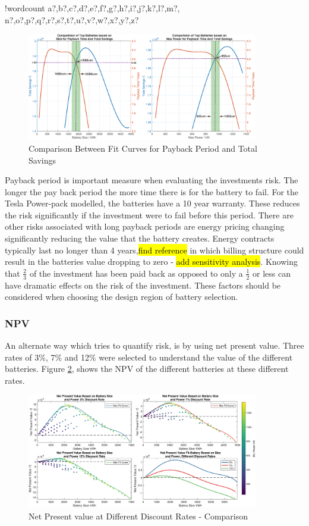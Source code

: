 \documentclass[fontsize=9.5pt]{extarticle}
\numberwithin{figure}{section} %
\newcounter{words}
\newenvironment{counted}{%
  \setcounter{words}{0}
  \SearchList!{wordcount}{\stepcounter{words}}
    {a?,b?,c?,d?,e?,f?,g?,h?,i?,j?,k?,l?,m?,
    n?,o?,p?,q?,r?,s?,t?,u?,v?,w?,x?,y?,z?}
  \UndoBoundary{'}
  \SearchOrder{p;}}{%
  \StopSearching}
\begin{document}
\begin{counted}
\begin{figure}[H]
 \centering
 \includegraphics[trim = 0 0 0 0, clip, width=0.9\textwidth]{SRTSPB5ed2.eps}
 \caption{Comparison Between Fit Curves for Payback Period and Total Savings}
 \label{SRTSPB5}
 \end{figure}

Payback period is important measure when evaluating the investments
risk. The longer the pay back period the more time there is for the
battery to fail. For the Tesla Power-pack modelled, the batteries have a
10 year warranty. These reduces the risk significantly if the investment
were to fail before this period. There are other risks associated with
long payback periods are energy pricing changing significantly reducing
the value that the battery creates. Energy contracts typically last no
longer than 4 years,\hl{find reference} in which billing structure could
result in the batteries value dropping to zero -
\hl{add sensitivity analysis}. Knowing that \(\frac{2}{3}\) of the
investment has been paid back as opposed to only a \(\frac{1}{2}\) or
less can have dramatic effects on the risk of the investment. These
factors should be considered when choosing the design region of battery
selection.

\subsubsection{NPV}\label{npv}

An alternate way which tries to quantify risk, is by using net present
value. Three rates of 3\%, 7\% and 12\% were selected to understand the
value of the different batteries. Figure \ref{SRNPV1}, shows the NPV of
the different batteries at these different rates.

\begin{figure}[H]
 \centering
 \includegraphics[trim = 0 0 0 0, clip, width=0.9\textwidth]{SRNPV1.eps}
 \caption{Net Present value at Different Discount Rates - Comparison}
 \label{SRNPV1}
\end{figure}


\end{counted}
\end{document}
